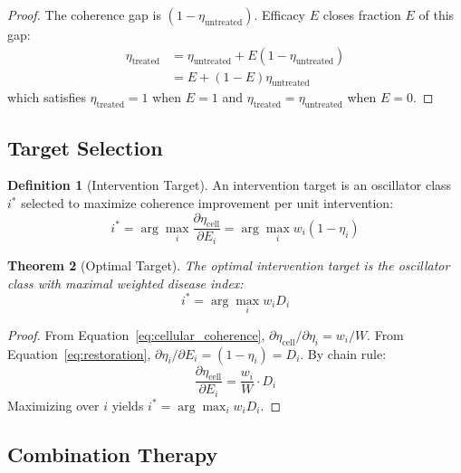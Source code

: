 \documentclass[10pt,twocolumn]{article}
\theoremstyle{plain}
\newtheorem{theorem}{Theorem}[section]
\theoremstyle{definition}
\newtheorem{definition}[theorem]{Definition}
\theoremstyle{remark}
\newcommand{\etacell}{\eta_{\mathrm{cell}}}
\begin{document}
\begin{proof}
The coherence gap is $(1 - \eta_{\mathrm{untreated}})$. Efficacy $E$ closes fraction $E$ of this gap:
\begin{align}
\eta_{\mathrm{treated}} &= \eta_{\mathrm{untreated}} + E(1 - \eta_{\mathrm{untreated}}) \\
&= E + (1-E)\eta_{\mathrm{untreated}}
\end{align}
which satisfies $\eta_{\mathrm{treated}} = 1$ when $E = 1$ and $\eta_{\mathrm{treated}} = \eta_{\mathrm{untreated}}$ when $E = 0$.
\end{proof}

\subsection{Target Selection}

\begin{definition}[Intervention Target]
\label{def:target}
An intervention target is an oscillator class $i^*$ selected to maximize coherence improvement per unit intervention:
\begin{equation}
i^* = \arg\max_{i} \frac{\partial \etacell}{\partial E_i} = \arg\max_{i} w_i (1 - \eta_i)
\label{eq:target}
\end{equation}
\end{definition}

\begin{theorem}[Optimal Target]
\label{thm:optimal_target}
The optimal intervention target is the oscillator class with maximal weighted disease index:
\begin{equation}
i^* = \arg\max_{i} w_i D_i
\label{eq:optimal_target}
\end{equation}
\end{theorem}

\begin{proof}
From Equation~\eqref{eq:cellular_coherence}, $\partial \etacell / \partial \eta_i = w_i / W$. From Equation~\eqref{eq:restoration}, $\partial \eta_i / \partial E_i = (1 - \eta_i) = D_i$. By chain rule:
\begin{equation}
\frac{\partial \etacell}{\partial E_i} = \frac{w_i}{W} \cdot D_i
\end{equation}
Maximizing over $i$ yields $i^* = \arg\max_i w_i D_i$.
\end{proof}

\subsection{Combination Therapy}
\end{document}
